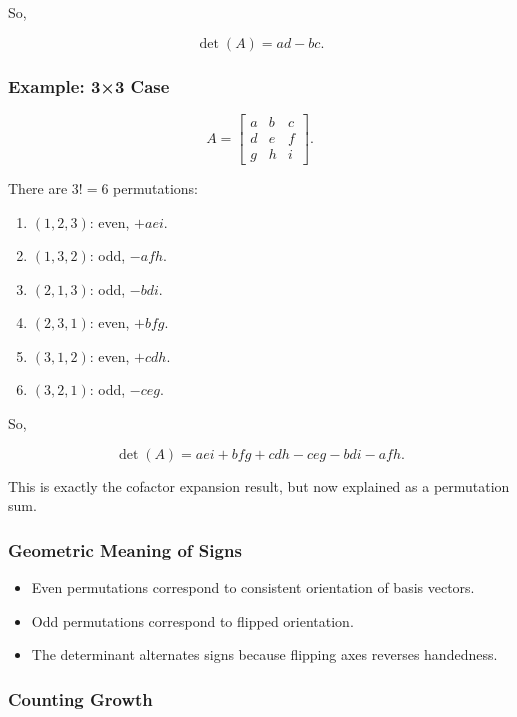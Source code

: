 \documentclass[
  letterpaper,
  DIV=11,
  numbers=noendperiod]{scrreprt}
\providecommand{\tightlist}{%
  \setlength{\itemsep}{0pt}\setlength{\parskip}{0pt}}
\begin{document}
So,

\[
\det(A) = ad - bc.
\]

\subsubsection{Example: 3×3 Case}\label{example-33-case-2}

\[
A = \begin{bmatrix} a & b & c \\ d & e & f \\ g & h & i \end{bmatrix}.
\]

There are \(3! = 6\) permutations:

\begin{enumerate}
\def\labelenumi{\arabic{enumi}.}
\tightlist
\item
  \((1,2,3)\): even, \(+aei\).
\item
  \((1,3,2)\): odd, \(-afh\).
\item
  \((2,1,3)\): odd, \(-bdi\).
\item
  \((2,3,1)\): even, \(+bfg\).
\item
  \((3,1,2)\): even, \(+cdh\).
\item
  \((3,2,1)\): odd, \(-ceg\).
\end{enumerate}

So,

\[
\det(A) = aei + bfg + cdh - ceg - bdi - afh.
\]

This is exactly the cofactor expansion result, but now explained as a
permutation sum.

\subsubsection{Geometric Meaning of
Signs}\label{geometric-meaning-of-signs}

\begin{itemize}
\tightlist
\item
  Even permutations correspond to consistent orientation of basis
  vectors.
\item
  Odd permutations correspond to flipped orientation.
\item
  The determinant alternates signs because flipping axes reverses
  handedness.
\end{itemize}

\subsubsection{Counting Growth}\label{counting-growth}
\end{document}
